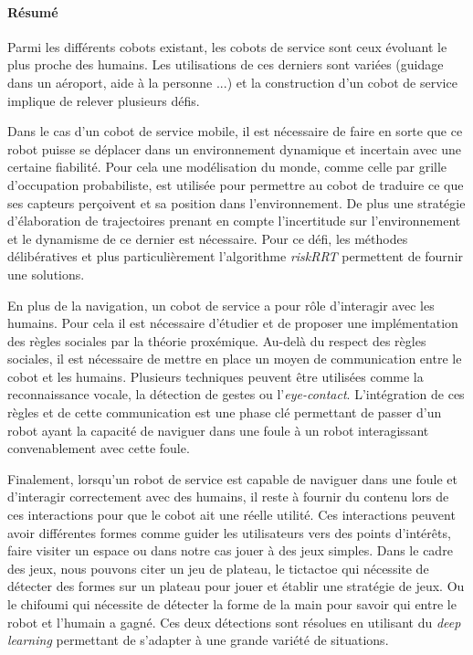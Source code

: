 {
\thispagestyle{empty}
\paragraph{Résumé \\}
\begin{spacing}{1.5}
Parmi les différents cobots existant, les cobots de service sont ceux évoluant le plus proche des humains. Les utilisations de ces derniers sont variées (guidage dans un aéroport, aide à la personne ...) et la construction d'un cobot de service implique de relever plusieurs défis.

Dans le cas d'un cobot de service mobile, il est nécessaire de faire en sorte que ce robot puisse se déplacer dans un environnement dynamique et incertain avec une certaine fiabilité. Pour cela une modélisation du monde, comme celle par grille d'occupation probabiliste, est utilisée pour permettre au cobot de traduire ce que ses capteurs perçoivent et sa position dans l'environnement. De plus une stratégie d'élaboration de trajectoires prenant en compte l'incertitude sur l'environnement et le dynamisme de ce dernier est nécessaire. Pour ce défi, les méthodes délibératives et plus particulièrement l'algorithme \textit{riskRRT} permettent de fournir une solutions.

En plus de la navigation, un cobot de service a pour rôle d'interagir avec les humains. Pour cela il est nécessaire d'étudier et de proposer une implémentation des règles sociales par la théorie proxémique. Au-delà du respect des règles sociales, il est nécessaire de mettre en place un moyen de communication entre le cobot et les humains. Plusieurs techniques peuvent être utilisées comme la reconnaissance vocale, la détection de gestes ou l'\textit{eye-contact}. L'intégration de ces règles et de cette communication est une phase clé permettant de passer d'un robot ayant la capacité de naviguer dans une foule à un robot interagissant convenablement avec cette foule.

Finalement, lorsqu'un robot de service est capable de naviguer dans une foule et d'interagir correctement avec des humains, il reste à fournir du contenu lors de ces interactions pour que le cobot ait une réelle utilité. Ces interactions peuvent avoir différentes formes comme guider les utilisateurs vers des points d'intérêts, faire visiter un espace ou dans notre cas jouer à des jeux simples. Dans le cadre des jeux, nous pouvons citer un jeu de plateau, le tictactoe qui nécessite de détecter des formes sur un plateau pour jouer et établir une stratégie de jeux. Ou le chifoumi qui nécessite de détecter la forme de la main pour savoir qui entre le robot et l'humain a gagné. Ces deux détections sont résolues en utilisant du \textit{deep learning} permettant de s'adapter à une grande variété de situations.
\end{spacing}
}